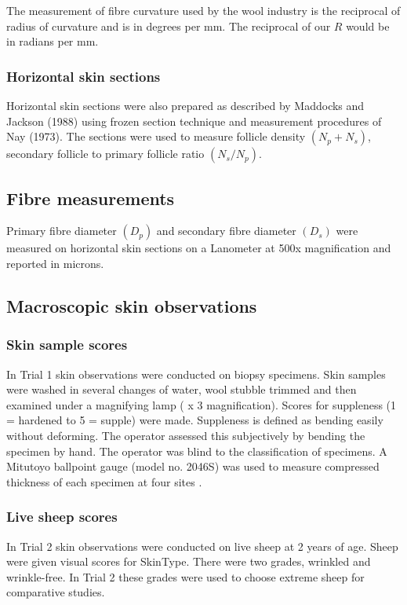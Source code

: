 \documentclass{article}
\begin{document}
The measurement of fibre curvature used by the wool industry is the reciprocal of radius of curvature and is in degrees per mm. The reciprocal of our $R$ would be in radians per mm.


\subsubsection{Horizontal skin sections}
Horizontal skin sections were also prepared as described by
Maddocks and Jackson (1988) using frozen section technique and
measurement procedures of Nay (1973). The sections were used to measure
follicle density $(N_{p} + N_{s})$, secondary follicle to primary follicle ratio $(N_{s}/N_{p})$.
 
\subsection{Fibre measurements}
Primary fibre diameter $(D_{p})$ and secondary fibre diameter $(D_{s})$ were measured on horizontal skin sections on a Lanometer at 500x magnification and reported in microns.

\subsection{Macroscopic skin observations}
\subsubsection{Skin sample scores}
In Trial 1 skin observations were conducted on biopsy specimens.
Skin samples were washed in several changes of water, wool stubble trimmed and then examined under a magnifying lamp ( x 3 magnification).  Scores for  suppleness (1 = hardened to 5 = supple) were made. Suppleness is defined as bending easily without deforming. The operator assessed this subjectively by bending the specimen by hand. The operator was blind to the classification of specimens.  A Mitutoyo ballpoint gauge (model no. 2046S) was used to measure compressed thickness of each specimen at four sites .  

\subsubsection{Live sheep scores}
In Trial 2 skin observations were conducted on live sheep at 2 years of age.
Sheep were given visual scores for SkinType. There were two grades, wrinkled and wrinkle-free. In Trial 2 these grades were used to choose extreme sheep for comparative studies. 
\end{document}
